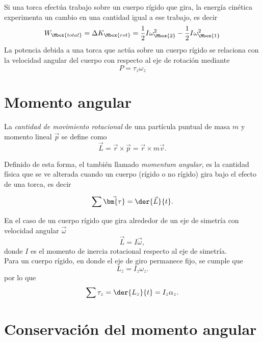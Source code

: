 Si una torca efectúa trabajo sobre un cuerpo rígido que gira, la energía cinética experimenta un cambio en una cantidad igual a ese trabajo, es decir
\begin{equation}
    W_{\Mbox{total}}=\Delta K_{\Mbox{rot}}=\frac{1}{2}I\omega_{\Mbox{2}}^2-\frac{1}{2}I\omega_{\Mbox{1}}^2
\end{equation}
La potencia debida a una torca que actúa sobre un cuerpo rígido se relaciona con la velocidad angular del cuerpo con respecto
al eje de rotación mediante
\begin{equation}
    P=\tau_z \omega_z
\end{equation}

\section{Momento angular}

La \textit{cantidad de movimiento rotacional} de una part\'icula puntual de masa $m$ y momento lineal $\vec{p}$ se define como
\begin{equation}
\vec{L}=\vec{r}\times\vec{p}=\vec{r}\times m \vec{v}.
\end{equation}

 Definido de esta forma, el tambi\'en llamado \textit{momentum angular}, es la cantidad f\'isica que se ve alterada cuando un cuerpo (r\'igido o no r\'igido) gira bajo el efecto de una torca, es decir

\begin{equation}
\sum \vec{\bm{\tau}}=\der{\vec{L}}{t}.
\end{equation}

En el caso de un cuerpo r\'igido que gira alrededor de un eje de simetr\'ia con velocidad angular $\vec{\omega}$
 \begin{equation}
\vec{L}=I\vec{\omega},
\end{equation}
donde $I$ es el momento de inercia rotacional respecto al eje de simetr\'ia. \\

Para un cuerpo r\'igido, en donde el eje de giro permanece fijo, se cumple que 
\begin{equation}
L_z=I_z\omega_z.
\end{equation}
por lo que 
\begin{equation}
\sum \tau_z=\der{L_z}{t}=I_z\alpha_z.
\end{equation}

\section{Conservaci\'on del momento angular}

